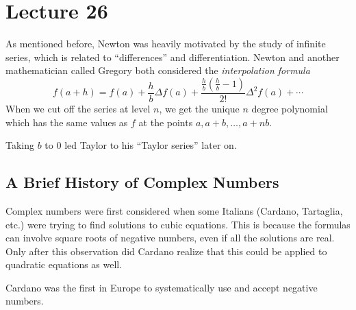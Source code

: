 \documentclass[class=article, crop=false]{standalone}
\begin{document}
  \section{Lecture 26}
  As mentioned before, Newton was heavily motivated by the study of infinite series, which is related to ``differences'' and differentiation. Newton and another mathematician called Gregory both considered the \emph{interpolation formula}
  \[
    f(a + h) = f(a) + \frac{h}{b}\Delta f(a) + \frac{\frac{h}{b}(\frac{h}{b} - 1)}{2!}\Delta^2f(a) + \dotsb
  \]
  When we cut off the series at level $n$, we get the unique $n$ degree polynomial which has the same values as $f$ at the points $a, a + b, \dotsc, a + nb$.
  \begin{note}{}
    Taking $b$ to 0 led Taylor to his ``Taylor series'' later on.
  \end{note}
  \subsection{A Brief History of Complex Numbers}
  Complex numbers were first considered when some Italians (Cardano, Tartaglia, etc.) were trying to find solutions to cubic equations. This is because the formulas can involve square roots of negative numbers, even if all the solutions are real. Only after this observation did Cardano realize that this could be applied to quadratic equations as well.
  \begin{note}{}
    Cardano was the first in Europe to systematically use and accept negative numbers.
  \end{note}
\end{document}
